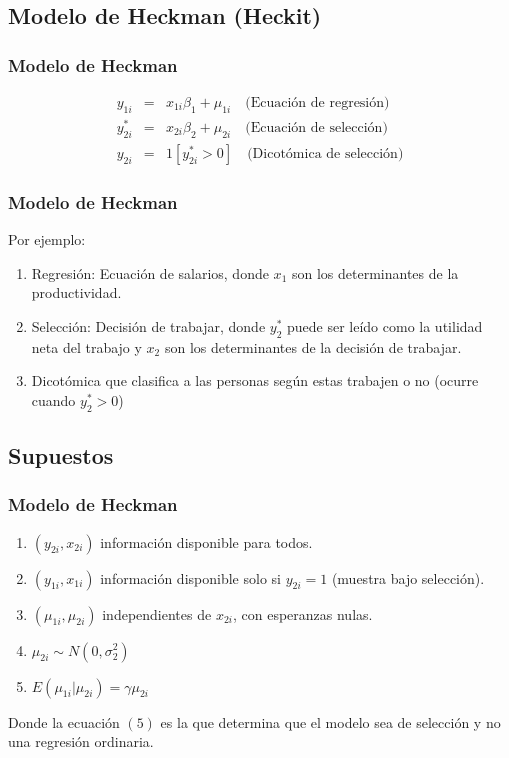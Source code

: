 \subsection{Modelo de Heckman (Heckit)}
\begin{frame}[fragile]
	\frametitle{Modelo de Heckman}
	
	\begin{eqnarray}
		y_{1i} &=& x_{1i}\beta_1+\mu_{1i} \quad \mbox{(Ecuación de regresión)} \\
		y_{2i}^* &=& x_{2i}\beta_2+\mu_{2i} \quad \mbox{(Ecuación de selección)} \\
		y_{2i} &=& 1[y_{2i}^*>0] \quad \mbox{(Dicotómica de selección)} 
	\end{eqnarray}
	
\end{frame}

\begin{frame}[fragile]
	\frametitle{Modelo de Heckman}
	
	Por ejemplo:
	
	\begin{enumerate}
		\item Regresión: Ecuación de salarios, donde $x_1$ son los determinantes de la productividad.
		\item Selección: Decisión de trabajar, donde $y_{2}^*$ puede ser leído como la utilidad neta del trabajo y $x_2$ son los determinantes de la decisión de trabajar.
		\item Dicotómica que clasifica a las personas según estas trabajen o no (ocurre cuando $y_{2}^*>0$)
	\end{enumerate}
	
\end{frame}

\subsection{Supuestos}

\begin{frame}[fragile]
	\frametitle{Modelo de Heckman}
	\begin{enumerate}
		\item $(y_{2i}, x_{2i})$ información disponible para todos.
		\item $(y_{1i}, x_{1i})$ información disponible solo si $y_{2i}=1$ (muestra bajo selección).
		\item $(\mu_{1i}, \mu_{2i})$ independientes de $x_{2i}$, con esperanzas nulas.
		\item $\mu_{2i} \sim N(0,\sigma_2^2)$
		\item $E(\mu_{1i} | \mu_{2i})=\gamma \mu_{2i}$
	\end{enumerate}
	
	Donde la ecuación $(5)$ es la que determina que el modelo sea de selección y no una regresión ordinaria.
	
\end{frame}


